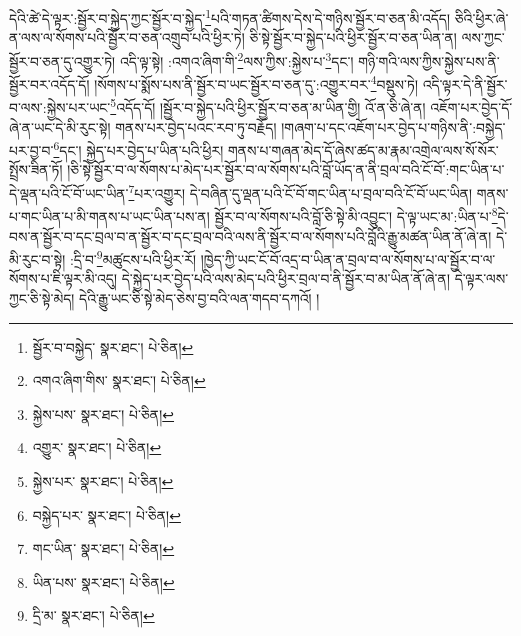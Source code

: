 དེའི་ཚེ་དེ་ལྟར་:སྦྱོར་བ་སྐྱེད་ཀྱང་སྦྱོར་བ་སྐྱེད་\footnote{སྦྱོར་བ་བསྐྱེད་  སྣར་ཐང་།  པེ་ཅིན། }པའི་གཏན་ཚིགས་དེས་དེ་གཉིས་སྦྱོར་བ་ཅན་མི་འདོད། ཅིའི་ཕྱིར་ཞེ་ན་ལས་ལ་སོགས་པའི་སྦྱོར་བ་ཅན་འགྲུབ་པའི་ཕྱིར་ཏེ། ཅི་སྟེ་སྦྱོར་བ་སྐྱེད་པའི་ཕྱིར་སྦྱོར་བ་ཅན་ཡིན་ན། ལས་ཀྱང་སྦྱོར་བ་ཅན་དུ་འགྱུར་ཏེ། འདི་ལྟ་སྟེ། :འགའ་ཞིག་གི་\footnote{འགའ་ཞིག་གིས་  སྣར་ཐང་།  པེ་ཅིན། }ལས་ཀྱིས་:སྐྱེས་པ་\footnote{སྐྱེས་པས་  སྣར་ཐང་།  པེ་ཅིན། }དང་། གཉི་གའི་ལས་ཀྱིས་སྐྱེས་པས་ནི་སྦྱོར་བར་འདོད་དོ། །སོགས་པ་སྨོས་པས་ནི་སྦྱོར་བ་ཡང་སྦྱོར་བ་ཅན་དུ་:འགྱུར་བར་\footnote{འགྱུར་  སྣར་ཐང་།  པེ་ཅིན། }བསྡུས་ཏེ། འདི་ལྟར་དེ་ནི་སྦྱོར་བ་ལས་:སྐྱེས་པར་ཡང་\footnote{སྐྱེས་པར་  སྣར་ཐང་།  པེ་ཅིན། }འདོད་དོ། །སྦྱོར་བ་སྐྱེད་པའི་ཕྱིར་སྦྱོར་བ་ཅན་མ་ཡིན་གྱི། འོ་ན་ཅི་ཞེ་ན། འཇོག་པར་བྱེད་དོ་ཞེ་ན་ཡང་དེ་མི་རུང་སྟེ། གནས་པར་བྱེད་པའང་རབ་ཏུ་བརྗོད། །གཞག་པ་དང་འཇོག་པར་བྱེད་པ་གཉིས་ནི་:བསྐྱེད་པར་བྱ་བ་\footnote{བསྐྱེད་པར་  སྣར་ཐང་།  པེ་ཅིན། }དང་། སྐྱེད་པར་བྱེད་པ་ཡིན་པའི་ཕྱིར། གནས་པ་གཞན་མེད་དོ་ཞེས་ཚད་མ་རྣམ་འགྲེལ་ལས་སོ་སོར་སྤྲོས་ཟིན་ཏོ། །ཅི་སྟེ་སྦྱོར་བ་ལ་སོགས་པ་མེད་པར་སྦྱོར་བ་ལ་སོགས་པའི་བློ་ཡོད་ན་ནི་བྲལ་བའི་ངོ་བོ་:གང་ཡིན་པ་དེ་ལྡན་པའི་ངོ་བོ་ཡང་ཡིན་\footnote{གང་ཡིན་  སྣར་ཐང་།  པེ་ཅིན། }པར་འགྱུར། དེ་བཞིན་དུ་ལྡན་པའི་ངོ་བོ་གང་ཡིན་པ་བྲལ་བའི་ངོ་བོ་ཡང་ཡིན། གནས་པ་གང་ཡིན་པ་མི་གནས་པ་ཡང་ཡིན་པས་ན། སྦྱོར་བ་ལ་སོགས་པའི་བློ་ཅི་སྟེ་མི་འབྱུང་། དེ་ལྟ་ཡང་མ་:ཡིན་པ་\footnote{ཡིན་པས་  སྣར་ཐང་།  པེ་ཅིན། }དེ་བས་ན་སྦྱོར་བ་དང་བྲལ་བ་ན་སྦྱོར་བ་དང་བྲལ་བའི་ལས་ནི་སྦྱོར་བ་ལ་སོགས་པའི་བློའི་རྒྱུ་མཚན་ཡིན་ནོ་ཞེ་ན། དེ་མི་རུང་བ་སྟེ། :དྲི་བ་\footnote{དྲི་མ་  སྣར་ཐང་།  པེ་ཅིན། }མཚུངས་པའི་ཕྱིར་རོ། །ཁྱེད་ཀྱི་ཡང་ངོ་བོ་འདྲ་བ་ཡིན་ན་བྲལ་བ་ལ་སོགས་པ་ལ་སྦྱོར་བ་ལ་སོགས་པ་ཇི་ལྟར་མི་འདུ། དེ་སྐྱེད་པར་བྱེད་པའི་ལས་མེད་པའི་ཕྱིར་བྲལ་བ་ནི་སྦྱོར་བ་མ་ཡིན་ནོ་ཞེ་ན། དེ་ལྟར་ལས་ཀྱང་ཅི་སྟེ་མེད། དེའི་རྒྱུ་ཡང་ཅི་སྟེ་མེད་ཅེས་བྱ་བའི་ལན་གདབ་དཀའོ། །
